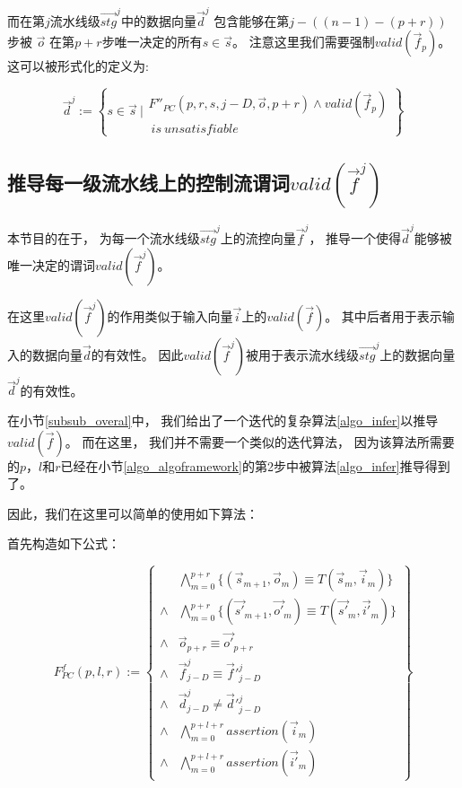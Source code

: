而在第$j$流水线级$\vec{stg}^j$中的数据向量$\vec{d}^j$
包含能够在第$j-((n-1)-(p+r))$步被
$\vec{o}$ 在第$p+r$步唯一决定的所有$s\in \vec{s}$。
注意这里我们需要强制$valid(\vec{f}_p)$。
这可以被形式化的定义为:

\begin{equation}\label{stgn_dj}
\vec{d}^{j} :=
 \left\{
 s\in \vec{s} ~|
 \begin{array}{cc}
 F''_{PC}(p,r,s,j-D,\vec{o},p+r)\wedge valid(\vec{f}_p)\\
 ~is~unsatisfiable
 \end{array}
\right\}
\end{equation}


\subsection{推导每一级流水线上的控制流谓词$valid(\vec{f}^j)$}\label{subsec_inferstage}
本节目的在于，
为每一个流水线级$\vec{stg}^j$上的流控向量$\vec{f}^j$，
推导一个使得$\vec{d}^j$能够被唯一决定的谓词$valid(\vec{f}^j)$。

在这里$valid(\vec{f}^j)$的作用类似于输入向量$\vec{i}$上的$valid(\vec{f})$。
其中后者用于表示输入的数据向量$\vec{d}$的有效性。
因此$valid(\vec{f}^j)$被用于表示流水线级$\vec{stg}^j$上的数据向量$\vec{d}^j$的有效性。

在小节\ref{subsub_overal}中，
我们给出了一个迭代的复杂算法\ref{algo_infer}以推导$valid(\vec{f})$。
而在这里，
我们并不需要一个类似的迭代算法，
因为该算法所需要的$p$，$l$和$r$已经在小节\ref{algo_algoframework}的第2步中被算法\ref{algo_infer}推导得到了。

因此，我们在这里可以简单的使用如下算法：

首先构造如下公式：

\begin{equation}\label{uniqt1d_chap6}
F^f_{PC}(p,l,r):=
\left\{
\begin{array}{cc}
&\bigwedge_{m=0}^{p+r}
\{
(\vec{s}_{m+1},\vec{o}_m)\equiv T(\vec{s}_m,\vec{i}_m)
\}
\\
\wedge&\bigwedge_{m=0}^{p+r}
\{
(\vec{s'}_{m+1},\vec{o'}_m)\equiv T(\vec{s'}_m,\vec{i'}_m)
\}
\\
\wedge&\vec{o}_{p+r}\equiv \vec{o'}_{p+r} \\
\wedge& \vec{f}^j_{j-D}\equiv \vec{f}'^j_{j-D} \\
\wedge& \vec{d}^j_{j-D}\ne \vec{d}'^j_{j-D} \\
\wedge&\bigwedge_{m=0}^{p+l+r}assertion(\vec{i}_m) \\
\wedge&\bigwedge_{m=0}^{p+l+r}assertion(\vec{i'}_m)
\end{array}
\right\}
\end{equation}

